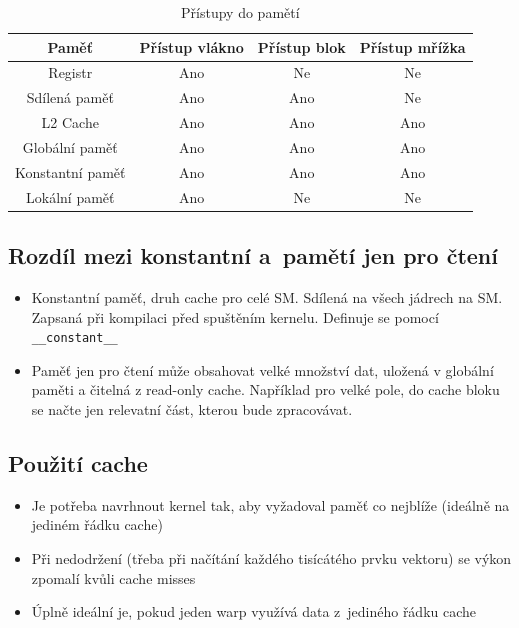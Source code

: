 \begin{table}[]
    \centering
    \begin{tabular}{|c|c|c|c|} \hline
        Paměť & Přístup vlákno & Přístup blok & Přístup mřížka \\ \hline
        Registr & Ano & Ne & Ne \\ \hline
        Sdílená paměť & Ano & Ano & Ne \\ \hline
        L2 Cache  & Ano & Ano & Ano \\ \hline
        Globální paměť & Ano & Ano & Ano  \\ \hline
        Konstantní paměť & Ano & Ano & Ano \\ \hline
        Lokální paměť & Ano & Ne & Ne \\ \hline
    \end{tabular}
    \caption{Přístupy do pamětí}
    \label{tab:my_label}
\end{table}

\subsection{Rozdíl mezi konstantní a~pamětí jen pro čtení}
\begin{itemize}
    \item Konstantní paměť, druh cache pro celé SM. Sdílená na všech jádrech na SM. Zapsaná při kompilaci před spuštěním kernelu. Definuje se pomocí \texttt{\_\_constant\_\_} 
    \item Paměť jen pro čtení může obsahovat velké množství dat, uložená v globální paměti a čitelná z read-only cache. Například pro velké pole, do cache bloku se načte jen relevatní část, kterou bude zpracovávat.
\end{itemize}

\subsection{Použití cache}
\begin{itemize}
    \item Je potřeba navrhnout kernel tak, aby vyžadoval paměť co nejblíže (ideálně na jediném řádku cache)
    \item Při nedodržení (třeba při načítání každého tisícátého prvku vektoru) se výkon zpomalí kvůli cache misses
    \item Úplně ideální je, pokud jeden warp využívá data z~jediného řádku cache
\end{itemize}

